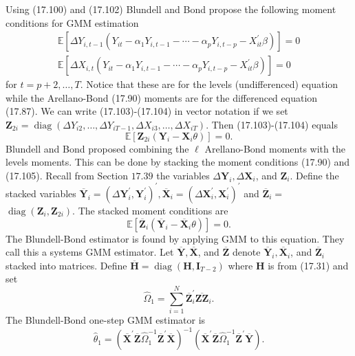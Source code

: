 \documentclass[10pt]{article}
\begin{document}
Using (17.100) and (17.102) Blundell and Bond propose the following moment conditions for GMM estimation
$$
\begin{gathered}
\mathbb{E}\left[\Delta Y_{i, t-1}\left(Y_{i t}-\alpha_{1} Y_{i, t-1}-\cdots-\alpha_{p} Y_{i, t-p}-X_{i t}^{\prime} \beta\right)\right]=0 \\
\mathbb{E}\left[\Delta X_{i, t}\left(Y_{i t}-\alpha_{1} Y_{i, t-1}-\cdots-\alpha_{p} Y_{i, t-p}-X_{i t}^{\prime} \beta\right)\right]=0
\end{gathered}
$$
for $t=p+2, \ldots, T$. Notice that these are for the levels (undifferenced) equation while the Arellano-Bond (17.90) moments are for the differenced equation (17.87). We can write (17.103)-(17.104) in vector notation if we set $\boldsymbol{Z}_{2 i}=\operatorname{diag}\left(\Delta Y_{i 2}, \ldots, \Delta Y_{i T-1}, \Delta X_{i 3}, \ldots, \Delta X_{i T}\right)$. Then (17.103)-(17.104) equals
$$
\mathbb{E}\left[\boldsymbol{Z}_{2 i}\left(\boldsymbol{Y}_{i}-\boldsymbol{X}_{i} \theta\right)\right]=0 .
$$
Blundell and Bond proposed combining the $\ell$ Arellano-Bond moments with the levels moments. This can be done by stacking the moment conditions (17.90) and (17.105). Recall from Section $17.39$ the variables $\Delta \boldsymbol{Y}_{i}, \Delta \boldsymbol{X}_{i}$, and $\boldsymbol{Z}_{i}$. Define the stacked variables $\overline{\boldsymbol{Y}}_{i}=\left(\Delta \boldsymbol{Y}_{i}^{\prime}, \boldsymbol{Y}_{i}^{\prime}\right)^{\prime}, \overline{\boldsymbol{X}}_{i}=\left(\Delta \boldsymbol{X}_{i}^{\prime}, \boldsymbol{X}_{i}^{\prime}\right)^{\prime}$ and $\overline{\boldsymbol{Z}}_{i}=$ $\operatorname{diag}\left(\boldsymbol{Z}_{i}, \boldsymbol{Z}_{2 i}\right)$. The stacked moment conditions are
$$
\mathbb{E}\left[\overline{\boldsymbol{Z}}_{i}\left(\overline{\boldsymbol{Y}}_{i}-\overline{\boldsymbol{X}}_{i} \theta\right)\right]=0 .
$$
The Blundell-Bond estimator is found by applying GMM to this equation. They call this a systems GMM estimator. Let $\overline{\boldsymbol{Y}}, \overline{\boldsymbol{X}}$, and $\overline{\boldsymbol{Z}}$ denote $\overline{\boldsymbol{Y}}_{i}, \overline{\boldsymbol{X}}_{i}$, and $\overline{\boldsymbol{Z}}_{i}$ stacked into matrices. Define $\overline{\boldsymbol{H}}=\operatorname{diag}\left(\boldsymbol{H}, \boldsymbol{I}_{T-2}\right)$ where $\boldsymbol{H}$ is from (17.31) and set
$$
\widehat{\Omega}_{1}=\sum_{i=1}^{N} \overline{\boldsymbol{Z}}_{i}^{\prime} \overline{\boldsymbol{Z Z}}_{i} .
$$
The Blundell-Bond one-step GMM estimator is
$$
\widehat{\theta}_{1}=\left(\overline{\boldsymbol{X}}^{\prime} \overline{\boldsymbol{Z}} \widehat{\Omega}_{1}^{-1} \overline{\boldsymbol{Z}}^{\prime} \overline{\boldsymbol{X}}\right)^{-1}\left(\overline{\boldsymbol{X}}^{\prime} \overline{\boldsymbol{Z}} \widehat{\Omega}_{1}^{-1} \overline{\boldsymbol{Z}}^{\prime} \overline{\boldsymbol{Y}}\right) .
$$
\end{document}
